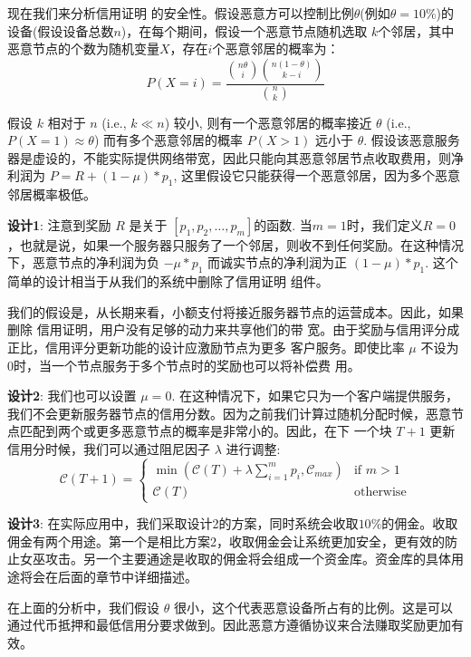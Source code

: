 \documentclass[a4paper]{article}
\begin{document}
现在我们来分析信用证明 的安全性。假设恶意方可以控制比例$\theta$(例如$\theta=10\%$)的设备(假设设备总数$n$)，在每个期间，假设一个恶意节点随机选取 $k$个邻居，其中恶意节点的个数为随机变量$X$，存在$i$个恶意邻居的概率为：
\begin{equation}
    P(X=i) = \frac{\binom{n\theta}{i} \binom{n(1-\theta)}{k-i}}{\binom{n}{k}}
\end{equation}

假设 $k$ 相对于 $n$ (i.e., $k \ll n$) 较小, 则有一个恶意邻居的概率接近 $\theta$ (i.e., $P(X=1) \approx \theta$) 而有多个恶意邻居的概率 $P(X>1)$ 远小于 $\theta$. 假设该恶意服务器是虚设的，不能实际提供网络带宽，因此只能向其恶意邻居节点收取费用，则净利润为 $P = R + (1-\mu)*p_1$, 这里假设它只能获得一个恶意邻居，因为多个恶意邻居概率极低。

\textbf{设计1}: 注意到奖励 $R$ 是关于 $[p_1,p_2,\ldots,p_m]$的函数.  当$m=1$时，我们定义$R=0$，也就是说，如果一个服务器只服务了一个邻居，则收不到任何奖励。在这种情况下，恶意节点的净利润为负 $-\mu*p_1$ 而诚实节点的净利润为正 $(1-\mu)*p_1$. 这个简单的设计相当于从我们的系统中删除了信用证明 组件。

我们的假设是，从长期来看，小额支付将接近服务器节点的运营成本。因此，如果删除 信用证明，用户没有足够的动力来共享他们的带 宽。由于奖励与信用评分成正比，信用评分更新功能的设计应激励节点为更多
客户服务。即使比率 $\mu$ 不设为0时，当一个节点服务于多个节点时的奖励也可以将补偿费
用。

\textbf{设计2}: 我们也可以设置 $\mu = 0$. 在这种情况下，如果它只为一个客户端提供服务，我们不会更新服务器节点的信用分数。因为之前我们计算过随机分配时候，恶意节点匹配到两个或更多恶意节点的概率是非常小的。因此，在下
一个块 $T+1$ 更新信用分时候，我们可以通过阻尼因子  $\lambda$ 进行调整:
\begin{equation}
    \mathcal{C}(T+1) = \left\{ \begin{array}{ll}
	\min(\mathcal{C}(T) + \lambda \sum_{i=1}^{m} p_i, \mathcal{C}_{max}) & \mbox{if $m>1$} \\
	\mathcal{C}(T)& \mbox{otherwise}
	\end{array} \right.
\end{equation}

\textbf{设计3}: 在实际应用中，我们采取设计2的方案，同时系统会收取$10\%$的佣金。收取佣金有两个用途。第一个是相比方案2，收取佣金会让系统更加安全，更有效的防止女巫攻击。另一个主要通途是收取的佣金将会组成一个资金库。资金库的具体用途将会在后面的章节中详细描述。

在上面的分析中，我们假设 $\theta$ 很小，这个代表恶意设备所占有的比例。这是可以通过代币抵押和最低信用分要求做到。因此恶意方遵循协议来合法赚取奖励更加有效。
\end{document}
